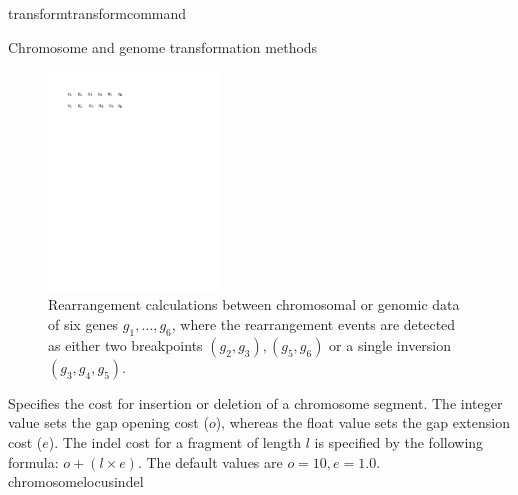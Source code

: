 \begin{command}{transform}{transformcommand}
\begin{arguments}
\begin{argumentgroup}{Chromosome and genome transformation methods}
\begin{figure}[!htbp]
\begin{center}
\includegraphics[width=0.4\textwidth]{doc/figures/breakpointDis.pdf}
\end{center}
\caption{Rearrangement calculations between chromosomal or genomic 
data of six genes $g_1, \ldots, g_6$, where the rearrangement events 
are detected as either two breakpoints $(g_2, g_3), (g_5, g_6)$
or a single inversion $(g_3, g_4, g_5)$.}
\label{fig:distance}
\end{figure}

\begin{description}         


{Specifies the cost for insertion or deletion of a
chromosome segment. The integer value sets the gap opening
cost ($o$), whereas the float value sets the gap extension
cost ($e$). The indel cost for a fragment of length $l$ is
specified by the following formula:
$o + (l \times e)$. The default values are $o=10, e=1.0$.}
{chromosomelocusindel}


\end{description}
\end{argumentgroup}
\end{arguments}
\end{command}
